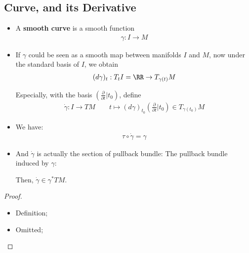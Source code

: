 \documentclass[Total.tex]{subfiles}
\begin{document}
			\subsection{Curve, and its Derivative}
			\begin{Def}
				\begin{itemize}
					\item 
					A \textbf{smooth curve} is a smooth function
					\begin{gather*}
						\gamma:I\rightarrow M
					\end{gather*}
					\item  If $\gamma$ could be seen as a smooth map between manifolds $I$ and $M$, now under the standard basis of $I$, we obtain
					\begin{gather*}
						(d\gamma)_t: T_tI=\RR\rightarrow T_{\gamma(t)} M
					\end{gather*}
					
					Especially, with the basis $(\frac{\partial }{\partial t}|t_0)$, define
					\begin{gather*}
						\dot{\gamma}: I\rightarrow TM\qquad t\mapsto (d\gamma)_{t_0}(\frac{\partial}{\partial t}|t_0)\in T_{\gamma(t_0)}M
					\end{gather*}
				\end{itemize}
			\end{Def}
				\begin{proposition}
					\begin{itemize}
						\item 
						We have:
						\begin{gather*}
							\tau \circ \dot{\gamma}=\gamma
						\end{gather*}
						\item And $\dot{\gamma}$ is actually the section of pullback bundle: The pullback bundle induced by $\gamma$:
						\begin{center}
						\end{center}
						
						Then, $\dot{\gamma}\in \gamma^*TM$. 
					\end{itemize}
				\end{proposition}
				\begin{proof}
					\begin{itemize}
						\item Definition;
						\item Omitted;
					\end{itemize}
				\end{proof}
				
\end{document}
